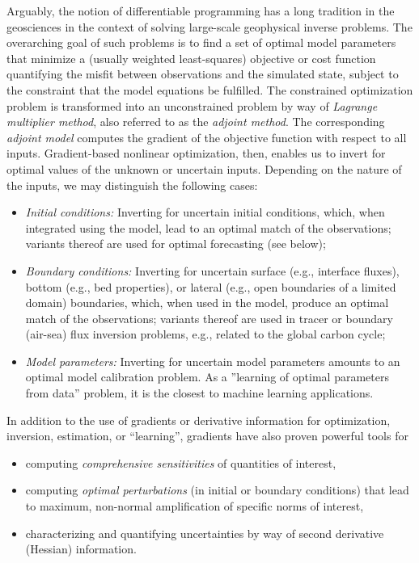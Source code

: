 Arguably, the notion of differentiable programming has a long tradition in the geosciences in the context of solving large-scale geophysical inverse problems.
The overarching goal of such problems is to find a set of optimal model parameters that minimize a (usually weighted least-squares) objective or cost function quantifying the misfit between observations and the simulated state, subject to the constraint that the model equations be fulfilled. 
The constrained optimization problem is transformed into an unconstrained problem by way of \emph{Lagrange multiplier method}\cite{Vadlamani.2020}, also referred to as the \emph{adjoint method}. 
The corresponding \textit{adjoint model} computes the gradient of the objective function with respect to all inputs. 
Gradient-based nonlinear optimization, then, enables us to invert for optimal values of the unknown or uncertain inputs.
Depending on the nature of the inputs, we may distinguish the following cases:
%
\begin{itemize}
\item \emph{Initial conditions:} Inverting for uncertain initial conditions, which, when integrated using the model, lead to an optimal match of the observations; variants thereof are used for optimal forecasting (see below);
\item \emph{Boundary conditions:} Inverting for uncertain surface (e.g., interface fluxes), bottom (e.g., bed properties), or lateral (e.g., open boundaries of a limited domain) boundaries, which, when used in the model, produce an optimal match of the observations; variants thereof are used in tracer or boundary (air-sea) flux inversion problems, e.g., related to the global carbon cycle;
\item \emph{Model parameters:} Inverting for uncertain model parameters amounts to an optimal model calibration problem. As a ''learning of optimal parameters from data'' problem, it is the closest to machine learning applications.
\end{itemize}
%
In addition to the use of gradients or derivative information for optimization, inversion, estimation, or ``learning'', gradients have also proven powerful tools for 
\begin{itemize}
\item
computing \emph{comprehensive sensitivities} of quantities of interest,
\item 
computing \emph{optimal perturbations} (in initial or boundary conditions) that lead to maximum, non-normal amplification of specific norms of interest,
\item
characterizing and quantifying uncertainties by way of second derivative (Hessian) information.
\end{itemize}
